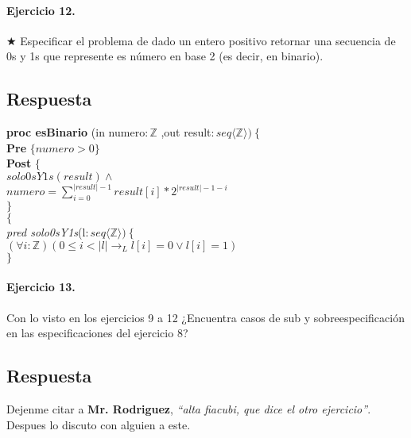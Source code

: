 \documentclass[a4paper]{article}
\begin{document}
\paragraph*{Ejercicio 12.}$\bigstar$ Especificar el problema de dado un entero positivo retornar una secuencia de 0s y 1s que represente es número en base 2 (es decir, en binario).
\subsection*{Respuesta}

\textbf{proc esBinario }(in numero$:\mathbb{Z}$
				,out result$:seq\langle \mathbb{Z}\rangle )\ \{$\smallskip \\
			\hspace*{6mm} \textbf{Pre }$\{ numero >0\}$\smallskip \\
			\hspace*{6mm} \textbf{Post }$\{$\\
			\hspace*{6mm} $solo0sY1s(result)\wedge$\\
			\hspace*{6mm} $numero=\sum_{i=0}^{|result|-1}result[i]*2^{|result|-1-i}$\\
			\hspace*{6mm} $\}$\\
			$\{$\smallskip \\
			
			\textit{pred solo0sY1s}(l$: seq\langle \mathbb{Z}\rangle)\ \{$\smallskip \\
			\hspace*{6mm}$(\forall i:\mathbb{Z})(0\leq i< |l|\rightarrow_L l[i]=0\vee l[i]=1)$\\
			$\}$
\paragraph*{Ejercicio 13.} Con lo visto en los ejercicios 9 a 12 ¿Encuentra casos de sub y sobreespecificación en las especificaciones del ejercicio 8?
\subsection*{Respuesta}
Dejenme citar a \textbf{Mr. Rodriguez}, \textit{``alta fiacubi, que dice el otro ejercicio''}.
Despues lo discuto con alguien a este.
	
\end{document}
